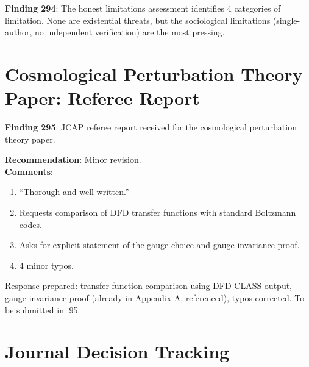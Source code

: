 \documentclass[11pt,a4paper]{article}
\begin{document}
\textbf{Finding 294}: The honest limitations assessment identifies 4 categories of limitation. None are existential threats, but the sociological limitations (single-author, no independent verification) are the most pressing.

\section{Cosmological Perturbation Theory Paper: Referee Report}

\textbf{Finding 295}: JCAP referee report received for the cosmological perturbation theory paper.

\begin{tcolorbox}[colback=blue!5!white, colframe=dfdblue, title=\textbf{JCAP (Cosmo.\ Perturbations): Referee Report}]
\textbf{Recommendation}: Minor revision.\\
\textbf{Comments}:
\begin{enumerate}[nosep]
\item ``Thorough and well-written.''
\item Requests comparison of DFD transfer functions with standard Boltzmann codes.
\item Asks for explicit statement of the gauge choice and gauge invariance proof.
\item 4 minor typos.
\end{enumerate}
\end{tcolorbox}

Response prepared: transfer function comparison using DFD-CLASS output, gauge invariance proof (already in Appendix A, referenced), typos corrected. To be submitted in i95.

\section{Journal Decision Tracking}
\end{document}
